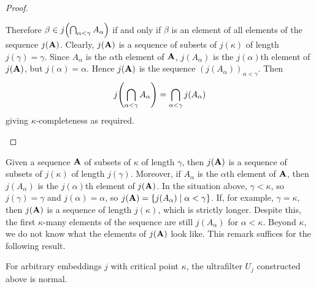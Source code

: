 \begin{proof}
\begin{itemize}
        Therefore \( \beta \in j\qty(\bigcap_{\alpha < \gamma} A_\alpha) \) if and only if \( \beta \) is an element of all elements of the sequence \( j(\vb A) \).
        Clearly, \( j(\vb A) \) is a sequence of subsets of \( j(\kappa) \) of length \( j(\gamma) = \gamma \).
        Since \( A_\alpha \) is the \( \alpha \)th element of \( \vb A \), \( j(A_\alpha) \) is the \( j(\alpha) \)th element of \( j(\vb A) \), but \( j(\alpha) = \alpha \).
        Hence \( j(\vb A) \) is the sequence \( (j(A_\alpha))_{\alpha < \gamma} \).
        Then
        \[ j\qty(\bigcap_{\alpha < \gamma} A_{\alpha}) = \bigcap_{\alpha < \gamma} j(A_\alpha) \]
        giving \( \kappa \)-completeness as required.
    \end{itemize}
\end{proof}
\begin{remark}
    Given a sequence \( \vb A \) of subsets of \( \kappa \) of length \( \gamma \), then \( j(\vb A) \) is a sequence of subsets of \( j(\kappa) \) of length \( j(\gamma) \).
    Moreover, if \( A_\alpha \) is the \( \alpha \)th element of \( \vb A \), then \( j(A_\alpha) \) is the \( j(\alpha) \)th element of \( j(\vb A) \).
    In the situation above, \( \gamma < \kappa \), so \( j(\gamma) = \gamma \) and \( j(\alpha) = \alpha \), so \( j(\vb A) = \qty{j(A_\alpha) \mid \alpha < \gamma} \).
    If, for example, \( \gamma = \kappa \), then \( j(\vb A) \) is a sequence of length \( j(\kappa) \), which is strictly longer.
    Despite this, the first \( \kappa \)-many elements of the sequence are still \( j(A_\alpha) \) for \( \alpha < \kappa \).
    Beyond \( \kappa \), we do not know what the elements of \( j(\vb A) \) look like.
    This remark suffices for the following result.
\end{remark}
\begin{proposition}
    For arbitrary embeddings \( j \) with critical point \( \kappa \), the ultrafilter \( U_j \) constructed above is normal.
\end{proposition}
